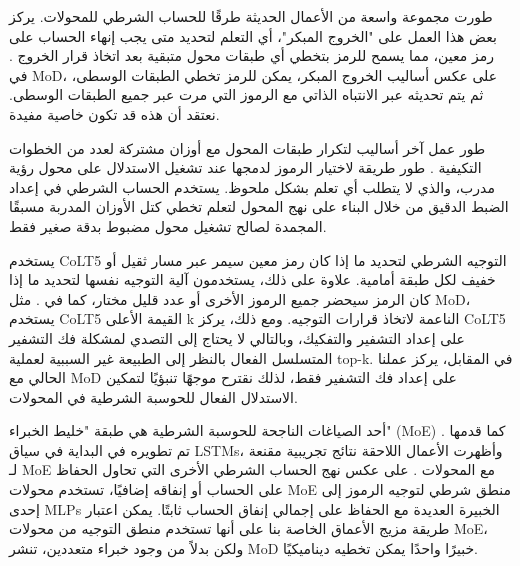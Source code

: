 \documentclass[11pt, a4paper, onecolumn, logo, copyright]{googledeepmind}
\begin{document}
طورت مجموعة واسعة من الأعمال الحديثة طرقًا للحساب الشرطي للمحولات. يركز بعض هذا العمل على "الخروج المبكر"، أي التعلم لتحديد متى يجب إنهاء الحساب على رمز معين، مما يسمح للرمز بتخطي أي طبقات محول متبقية بعد اتخاذ قرار الخروج \citep{elbayad_depth, liu2021anytime, schuster2022confident}. في MoD، على عكس أساليب الخروج المبكر، يمكن للرمز تخطي الطبقات الوسطى، ثم يتم تحديثه عبر الانتباه الذاتي مع الرموز التي مرت عبر جميع الطبقات الوسطى. نعتقد أن هذه قد تكون خاصية مفيدة.

طور عمل آخر أساليب لتكرار طبقات المحول مع أوزان مشتركة لعدد من الخطوات التكيفية \citep{simoulin-crabbe-2021-many, dehghani2018universal}. طور \citep{bolya2023token} طريقة لاختيار الرموز لدمجها عند تشغيل الاستدلال على محول رؤية مدرب، والذي لا يتطلب أي تعلم بشكل ملحوظ. يستخدم \citet{lei2023conditional} الحساب الشرطي في إعداد الضبط الدقيق من خلال البناء على نهج المحول \citep{he2021towards} لتعلم تخطي كتل الأوزان المدربة مسبقًا المجمدة لصالح تشغيل محول مضبوط بدقة صغير فقط.

يستخدم CoLT5 \citep{ainslie2023colt5} التوجيه الشرطي لتحديد ما إذا كان رمز معين سيمر عبر مسار ثقيل أو خفيف لكل طبقة أمامية. علاوة على ذلك، يستخدمون آلية التوجيه نفسها لتحديد ما إذا كان الرمز سيحضر جميع الرموز الأخرى أو عدد قليل مختار، كما في \citet{guo2022longt5}. مثل MoD، يستخدم CoLT5 القيمة الأعلى k الناعمة لاتخاذ قرارات التوجيه. ومع ذلك، يركز CoLT5 على إعداد التشفير والتفكيك، وبالتالي لا يحتاج إلى التصدي لمشكلة فك التشفير المتسلسل الفعال بالنظر إلى الطبيعة غير السببية لعملية top-k. في المقابل، يركز عملنا الحالي مع MoD على إعداد فك التشفير فقط، لذلك نقترح موجهًا تنبؤيًا لتمكين الاستدلال الفعال للحوسبة الشرطية في المحولات.

أحد الصياغات الناجحة للحوسبة الشرطية هي طبقة "خليط الخبراء" (MoE) كما قدمها \citet{shazeer2017outrageously}. تم تطويره في البداية في سياق LSTMs، وأظهرت الأعمال اللاحقة نتائج تجريبية مقنعة لـ MoE مع المحولات \citep{lepikhin2020gshard, fedus2022switch, zoph2022stmoe}. على عكس نهج الحساب الشرطي الأخرى التي تحاول الحفاظ على الحساب أو إنفاقه إضافيًا، تستخدم محولات MoE منطق شرطي لتوجيه الرموز إلى إحدى MLPs الخبيرة العديدة مع الحفاظ على إجمالي إنفاق الحساب ثابتًا. يمكن اعتبار طريقة مزيج الأعماق الخاصة بنا على أنها تستخدم منطق التوجيه من محولات MoE، ولكن بدلاً من وجود خبراء متعددين، تنشر MoD خبيرًا واحدًا يمكن تخطيه ديناميكيًا.
\end{document}
